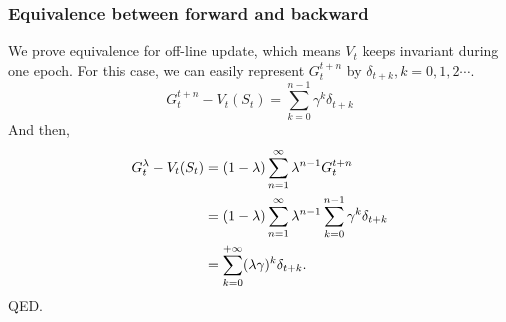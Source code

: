 \documentclass[11pt,a4paper]{article}
\begin{document}
\subsubsection{Equivalence between forward and backward}
We prove equivalence for off-line update, which means $V_t$ keeps invariant during one epoch. For this case, we can easily represent $G_{t}^{t+n}$ by $\delta_{t+k}, k=0,1,2\cdots$.
\begin{equation}
    G_{t}^{t+n} - V_t(S_t) = \sum_{k=0}^{n-1}\gamma^k \delta_{t+k}
\end{equation} 
And then,
\begin{equation}
    \aligned 
    G_{t}^{\lambda} - V_t(S_t) & = (1-\lambda)\sum_{n=1}^{\infty}\lambda^{n-1}G_{t}^{t+n}  \\ & = (1-\lambda)\sum_{n=1}^{\infty}\lambda^{n-1}\sum_{k=0}^{n-1}\gamma^k\delta_{t+k} \\ & = \sum_{k=0}^{+\infty} (\lambda\gamma)^k\delta_{t+k}.  
    \endaligned
\end{equation}
QED. \\ 
\end{document}

